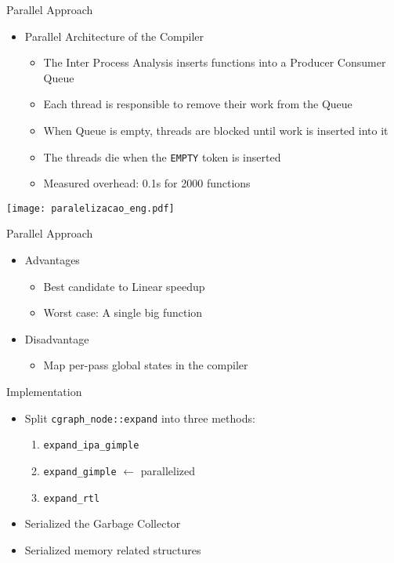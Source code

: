 \begin{frame}{Parallel Approach}
    \begin{itemize}
        \item Parallel Architecture of the Compiler
            \begin{itemize}
                \item The Inter Process Analysis inserts functions into a Producer Consumer Queue
                \item Each thread is responsible to remove their work from the Queue
                \item When Queue is empty, threads are blocked until work is inserted into it
                \item The threads die when the \texttt{EMPTY} token is inserted
                \item Measured overhead: 0.1s for 2000 functions
             \end{itemize}
\end{itemize}
 \centering
 \texttt{[image: paralelizacao\_eng.pdf]}
\end{frame}

\begin{frame}{Parallel Approach}
    \begin{itemize}
        \item Advantages
            \begin{itemize}
                \item Best candidate to Linear speedup
                \item Worst case: A single big function
            \end{itemize}
        \item Disadvantage
            \begin{itemize}
              \item Map per-pass global states in the compiler
            \end{itemize}
    \end{itemize}
\end{frame}

\begin{frame}{Implementation}
    \begin{itemize}
        \item Split \texttt{cgraph\_node::expand} into three methods:
            \begin{enumerate}
                \item \texttt{expand\_ipa\_gimple}
                \item \texttt{expand\_gimple} $\longleftarrow$ parallelized
                \item \texttt{expand\_rtl}
            \end{enumerate}
        \item Serialized the Garbage Collector
        \item Serialized memory related structures
    \end{itemize}
\end{frame}

